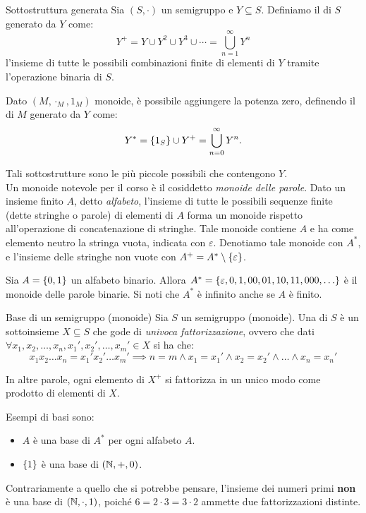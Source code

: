 \begin{definition}{Sottostruttura generata}
  Sia \((S,\cdot)\) un semigruppo e \(Y \subseteq S\).
  Definiamo il  di \(S\) generato da \(Y\) come:
  \[Y^+ = Y \cup Y^2 \cup Y^3 \cup \cdots = \bigcup_{n=1}^{\infty} Y^n\]
  l'insieme di tutte le possibili combinazioni finite di elementi di \(Y\) tramite l'operazione binaria di \(S\).

  Dato \((M,\cdot_M,1_M)\) monoide, è possibile aggiungere la potenza zero, definendo il  di \(M\) generato da \(Y\) come:
  \[Y^* = \set{1_S} \cup Y^+ = \bigcup_{n=0}^{\infty} Y^n.\]
\end{definition}

Tali sottostrutture sono le più piccole possibili che contengono \(Y\).\\
Un monoide notevole per il corso è il cosiddetto \emph{monoide delle parole}.
Dato un insieme finito \(A\), detto \emph{alfabeto}, l'insieme di tutte le possibili sequenze finite (dette stringhe o parole) di elementi di \(A\) forma un monoide rispetto all'operazione di concatenazione di stringhe. 
Tale monoide contiene \(A\) e ha come elemento neutro la stringa vuota, indicata con \(\varepsilon\).
Denotiamo tale monoide con \(A^*\), e l'insieme delle stringhe non vuote con \(A^+ = A^* \setminus \set\varepsilon\).

\begin{example}{}
  Sia \(A = \set{0,1}\) un alfabeto binario.
  Allora \(A^* = \set{\varepsilon, 0, 1, 00, 01, 10, 11, 000, \ldots}\) è il monoide delle parole binarie.
  Si noti che \(A^*\) è infinito anche se \(A\) è finito.
\end{example}

\begin{definition}{Base di un semigruppo (monoide)}
  Sia \(S\) un semigruppo (monoide).
  Una  di \(S\) è un sottoinsieme \(X \subseteq S\) che gode di \emph{univoca fattorizzazione}, ovvero che dati \(\forall x_1,x_2,\ldots,x_n,x_1',x_2',\ldots,x_m' \in X\) si ha che:
  \[x_1 x_2 \ldots x_n = x_1' x_2' \ldots x_m' \implies n=m \land x_1 = x_1' \land x_2 = x_2' \land \ldots \land x_n = x_n'\]
\end{definition}
In altre parole, ogni elemento di \(X^{+}\) si fattorizza in un unico modo come prodotto di elementi di \(X\).

\begin{example}{}
  Esempi di basi sono:
  \begin{itemize}
    \item \(A\) è una base di \(A^*\) per ogni alfabeto \(A\).
    \item \(\set{1}\) è una base di \((\mathbb{N}, +, 0)\).
  \end{itemize}
  Contrariamente a quello che si potrebbe pensare, l'insieme dei numeri primi \textbf{non} è una base di \((\mathbb{N}, \cdot, 1)\), poiché \(6 = 2 \cdot 3 = 3 \cdot 2\) ammette due fattorizzazioni distinte.
\end{example}

